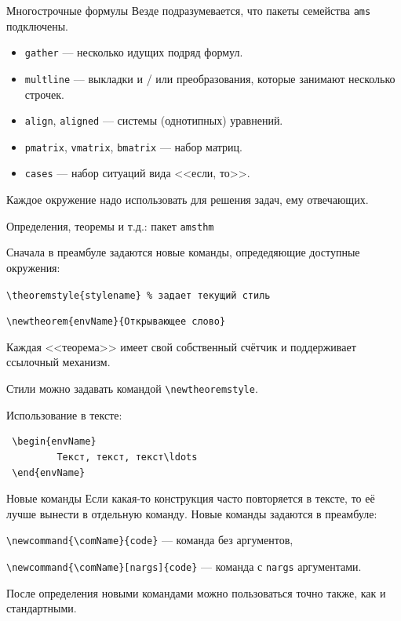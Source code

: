 \documentclass[ mathserif]{beamer}
\begin{document}
%
%
%
\begin{frame}{Многострочные формулы}
 Везде подразумевается, что пакеты семейства \texttt{ams} подключены. 
\begin{itemize}
 \item \texttt{gather} --- несколько идущих подряд формул.
 \item \texttt{multline} --- выкладки и / или преобразования, которые занимают несколько строчек.
 \item \texttt{align}, \texttt{aligned} --- системы (однотипных) уравнений.
 \item \texttt{pmatrix}, \texttt{vmatrix}, \texttt{bmatrix} --- набор матриц.  
 \item \texttt{cases} --- набор ситуаций вида <<если, то>>.
\end{itemize}
Каждое окружение надо использовать для решения задач, ему отвечающих.
\end{frame}
%
%
%
\begin{frame}[fragile]{Определения, теоремы и т.д.: пакет \texttt{amsthm}}
 
Сначала в преамбуле задаются новые команды, опредедяющие доступные окружения:

\verb:\theoremstyle{stylename} % задает текущий стиль:

\verb:\newtheorem{envName}{Открывающее слово}:

Каждая <<теорема>> имеет свой собственный счётчик и поддерживает ссылочный механизм. 

Стили можно задавать командой \verb:\newtheoremstyle:.

Использование в тексте:
\begin{verbatim}
 \begin{envName}
         Текст, текст, текст\ldots
 \end{envName}
\end{verbatim}
\end{frame}
%
%
%
\begin{frame}[fragile]{Новые команды}
 Если какая-то конструкция часто повторяется в тексте, то её лучше вынести в отдельную команду. Новые команды задаются в преамбуле:

\verb:\newcommand{\comName}{code}: --- команда без аргументов,

\verb:\newcommand{\comName}[nargs]{code}: --- команда с \texttt{nargs} аргументами.

После определения новыми командами можно пользоваться точно также, как и стандартными.
\end{frame}
\end{document}
